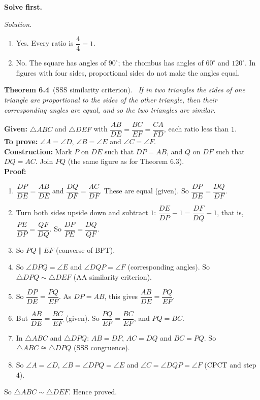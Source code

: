 \documentclass[11pt,a4paper]{article}
\theoremstyle{branddef}
\newenvironment{theorem}[2]
  {\par\medskip\Needspace{5\baselineskip}%
   \begin{tcolorbox}[enhanced,sharp corners,colback=white,colframe=black,boxrule=0.9pt,
     left=7pt,right=7pt,top=5pt,bottom=5pt]%
   \textbf{Theorem #1}\ (#2).\ \itshape}
  {\end{tcolorbox}\par\medskip}
\newcommand{\tr}{\triangle}
\newcounter{prob}
\newenvironment{solvefirst}
  {\par\smallskip\noindent\textbf{Solve first.}
   \begin{enumerate}[label=\textbf{P\arabic*.},leftmargin=2.2em,itemsep=3pt,start=\numexpr\value{prob}+1\relax]}
  {\setcounter{prob}{\value{enumi}}\end{enumerate}}
\newenvironment{solution}
  {\par\smallskip\begingroup\small\linespread{1.15}\selectfont\color{muted}\noindent\textit{Solution.}\par}
  {\par\endgroup\smallskip}
\newenvironment{steps}{\begin{enumerate}[label=\arabic*.,leftmargin=1.5em,itemsep=0pt,topsep=2pt]}{\end{enumerate}}
\begin{document}
\begin{solvefirst}
\begin{solution}
\begin{steps}
  \item[(a)] Yes. Every ratio is $\dfrac44=1$.
  \item[(b)] No. The square has angles of $90^\circ$; the rhombus has angles of $60^\circ$ and $120^\circ$. In figures with four sides, proportional sides do not make the angles equal.
\end{steps}
\end{solution}
\end{solvefirst}

\begin{theorem}{6.4}{SSS similarity criterion}
If in two triangles the sides of one triangle are proportional to the sides of the other triangle, then their corresponding angles are equal, and so the two triangles are similar.
\end{theorem}

\textbf{Given:} $\tr ABC$ and $\tr DEF$ with $\dfrac{AB}{DE}=\dfrac{BC}{EF}=\dfrac{CA}{FD}$, each ratio less than $1$.\\
\textbf{To prove:} $\angle A=\angle D$, $\angle B=\angle E$ and $\angle C=\angle F$.\\
\textbf{Construction:} Mark $P$ on $DE$ such that $DP=AB$, and $Q$ on $DF$ such that $DQ=AC$. Join $PQ$ (the same figure as for Theorem 6.3).\\
\textbf{Proof:}
\begin{steps}
  \item $\dfrac{DP}{DE}=\dfrac{AB}{DE}$ and $\dfrac{DQ}{DF}=\dfrac{AC}{DF}$. These are equal (given). So $\dfrac{DP}{DE}=\dfrac{DQ}{DF}$.
  \item Turn both sides upside down and subtract $1$: $\dfrac{DE}{DP}-1=\dfrac{DF}{DQ}-1$, that is, $\dfrac{PE}{DP}=\dfrac{QF}{DQ}$. So $\dfrac{DP}{PE}=\dfrac{DQ}{QF}$.
  \item So $PQ\parallel EF$ (converse of BPT).
  \item So $\angle DPQ=\angle E$ and $\angle DQP=\angle F$ (corresponding angles). So $\tr DPQ\sim\tr DEF$ (AA similarity criterion).
  \item So $\dfrac{DP}{DE}=\dfrac{PQ}{EF}$. As $DP=AB$, this gives $\dfrac{AB}{DE}=\dfrac{PQ}{EF}$.
  \item But $\dfrac{AB}{DE}=\dfrac{BC}{EF}$ (given). So $\dfrac{PQ}{EF}=\dfrac{BC}{EF}$, and $PQ=BC$.
  \item In $\tr ABC$ and $\tr DPQ$: $AB=DP$, $AC=DQ$ and $BC=PQ$. So $\tr ABC\cong\tr DPQ$ (SSS congruence).
  \item So $\angle A=\angle D$, $\angle B=\angle DPQ=\angle E$ and $\angle C=\angle DQP=\angle F$ (CPCT and step 4).
\end{steps}
So $\tr ABC\sim\tr DEF$. \hfill Hence proved.
\end{document}

